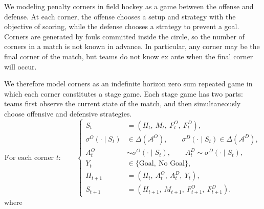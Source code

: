 \documentclass[11pt,english]{article}
\begin{document}
We modeling penalty corners in field hockey as a game between the offense and defense. At each corner, the offense chooses a setup and strategy with the objective of scoring, while the defense chooses a strategy to prevent a goal. Corners are generated by fouls committed inside the circle, so the number of corners in a match is not known in advance. In particular, any corner may be the final corner of the match, but teams do not know ex ante when the final corner will occur.

We therefore model corners as an indefinite horizon zero sum repeated game in which each corner constitutes a stage game. Each stage game has two parts: teams first observe the current state of the match, and then simultaneously choose offensive and defensive strategies.
\[
\text{For each corner } t:
\qquad
\left\{
\begin{aligned}
S_t
&=
(H_t,\ M_t,\ F^{O}_t,\ F^{D}_t),\\[4pt]
\sigma^O(\cdot \mid S_t)
&\in \Delta(\mathcal{A}^O),
\qquad
\sigma^D(\cdot \mid S_t)
\in \Delta(\mathcal{A}^D), \\[4pt]
A_t^O
&\sim \sigma^O(\cdot \mid S_t),
\qquad
A_t^D
\sim \sigma^D(\cdot \mid S_t), \\[4pt]
Y_t
&\in
\{\text{Goal},\ \text{No Goal}\}, \\[4pt]
H_{t+1}
&=
(H_t,\ A_t^O,\ A_t^D,\ Y_t), \\[4pt]
S_{t+1}
&=
(H_{t+1},\ M_{t+1},\ F^{O}_{t+1},\ F^{D}_{t+1}).
\end{aligned}
\right.
\]
where
\end{document}
